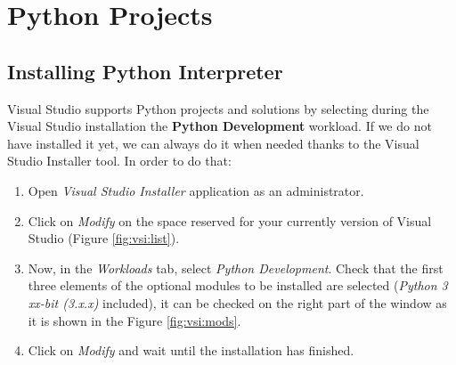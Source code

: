 \chapter{Python Projects} \label{sec:Python}

    \FloatBarrier
    \section{Installing Python Interpreter}

Visual Studio supports Python projects and solutions by selecting during the Visual Studio installation the \textbf{Python Development} workload. If we do not have installed it yet, we can always do it when needed thanks to the Visual Studio Installer tool. In order to do that:

\begin{enumerate}
	\item Open \textit{Visual Studio Installer} application as an administrator.
	\item Click on \textit{Modify} on the space reserved for your currently version of Visual Studio (Figure \ref{fig:vsi:list}). %
	\item Now, in the \textit{Workloads} tab, select \textit{Python Development}. Check that the first three elements of the optional modules to be installed are selected (\textit{Python 3 xx-bit (3.x.x)} included), it can be checked on the right part of the window as it is shown in the Figure \ref{fig:vsi:mods}.
	\item Click on \textit{Modify} and wait until the installation has finished.
\end{enumerate} 


